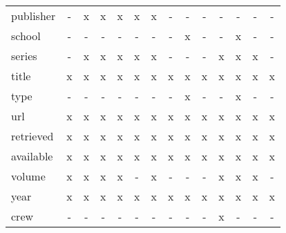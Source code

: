 \begin{singlespacing}
\begin{sideways}
\begin{tabular}{l c c c c c c c c c c c c c}
publisher     & - & x & x & x & x & x & - & - & - & - & - & - & - \\
school        & - & - & - & - & - & - & - & x & - & - & x & - & - \\
series        & - & x & x & x & x & x & - & - & - & x & x & x & - \\
title         & x & x & x & x & x & x & x & x & x & x & x & x & x \\
type          & - & - & - & - & - & - & - & x & - & - & x & - & - \\
url           & x & x & x & x & x & x & x & x & x & x & x & x & x \\
retrieved     & x & x & x & x & x & x & x & x & x & x & x & x & x \\
available     & x & x & x & x & x & x & x & x & x & x & x & x & x \\
volume        & x & x & x & x & - & x & - & - & - & x & x & x & - \\
year          & x & x & x & x & x & x & x & x & x & x & x & x & x \\
crew          & - & - & - & - & - & - & - & - & - & x & - & - & -
\end{tabular}
\end{sideways}
\end{singlespacing}
